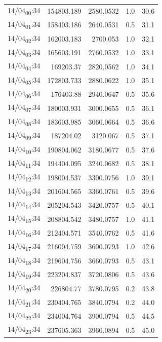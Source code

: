 \documentclass[11pt]{article}
\begin{document}
\begin{center}
\begin{tabular}{lrrrr}
14/04\textsubscript{00}:34 & 154803.189 & 2580.0532 & 1.0 & 30.6\\[0pt]
14/04\textsubscript{01}:34 & 158403.186 & 2640.0531 & 0.5 & 31.1\\[0pt]
14/04\textsubscript{02}:34 & 162003.183 & 2700.053 & 1.0 & 32.1\\[0pt]
14/04\textsubscript{03}:34 & 165603.191 & 2760.0532 & 1.0 & 33.1\\[0pt]
14/04\textsubscript{04}:34 & 169203.37 & 2820.0562 & 1.0 & 34.1\\[0pt]
14/04\textsubscript{05}:34 & 172803.733 & 2880.0622 & 1.0 & 35.1\\[0pt]
14/04\textsubscript{06}:34 & 176403.88 & 2940.0647 & 0.5 & 35.6\\[0pt]
14/04\textsubscript{07}:34 & 180003.931 & 3000.0655 & 0.5 & 36.1\\[0pt]
14/04\textsubscript{08}:34 & 183603.985 & 3060.0664 & 0.5 & 36.6\\[0pt]
14/04\textsubscript{09}:34 & 187204.02 & 3120.067 & 0.5 & 37.1\\[0pt]
14/04\textsubscript{10}:34 & 190804.062 & 3180.0677 & 0.5 & 37.6\\[0pt]
14/04\textsubscript{11}:34 & 194404.095 & 3240.0682 & 0.5 & 38.1\\[0pt]
14/04\textsubscript{12}:34 & 198004.537 & 3300.0756 & 1.0 & 39.1\\[0pt]
14/04\textsubscript{13}:34 & 201604.565 & 3360.0761 & 0.5 & 39.6\\[0pt]
14/04\textsubscript{14}:34 & 205204.543 & 3420.0757 & 0.5 & 40.1\\[0pt]
14/04\textsubscript{15}:34 & 208804.542 & 3480.0757 & 1.0 & 41.1\\[0pt]
14/04\textsubscript{16}:34 & 212404.571 & 3540.0762 & 0.5 & 41.6\\[0pt]
14/04\textsubscript{17}:34 & 216004.759 & 3600.0793 & 1.0 & 42.6\\[0pt]
14/04\textsubscript{18}:34 & 219604.756 & 3660.0793 & 0.5 & 43.1\\[0pt]
14/04\textsubscript{19}:34 & 223204.837 & 3720.0806 & 0.5 & 43.6\\[0pt]
14/04\textsubscript{20}:34 & 226804.77 & 3780.0795 & 0.2 & 43.8\\[0pt]
14/04\textsubscript{21}:34 & 230404.765 & 3840.0794 & 0.2 & 44.0\\[0pt]
14/04\textsubscript{22}:34 & 234004.764 & 3900.0794 & 0.5 & 44.5\\[0pt]
14/04\textsubscript{23}:34 & 237605.363 & 3960.0894 & 0.5 & 45.0\\[0pt]

\end{tabular}
\end{center}
\end{document}
